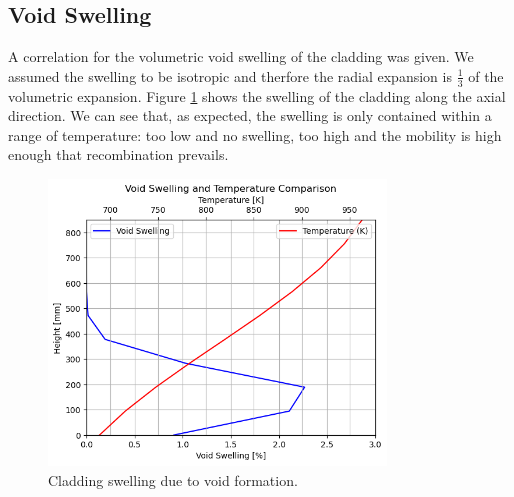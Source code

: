 \subsection{Void Swelling}
A correlation for the volumetric void swelling of the cladding was given. We assumed the swelling to be isotropic and therfore the radial expansion is $\frac{1}{3}$ of the volumetric expansion.
Figure \ref{fig:void_swelling} shows the swelling of the cladding along the axial direction.
We can see that, as expected, the swelling is only contained within a range of temperature: too low and no swelling, too high and the mobility is high enough that recombination prevails.

\begin{figure}[H]
\centering
\includegraphics[width=0.8\textwidth]{void_swell.png}
\caption{Cladding swelling due to void formation.}
\label{fig:void_swelling}
\end{figure}

